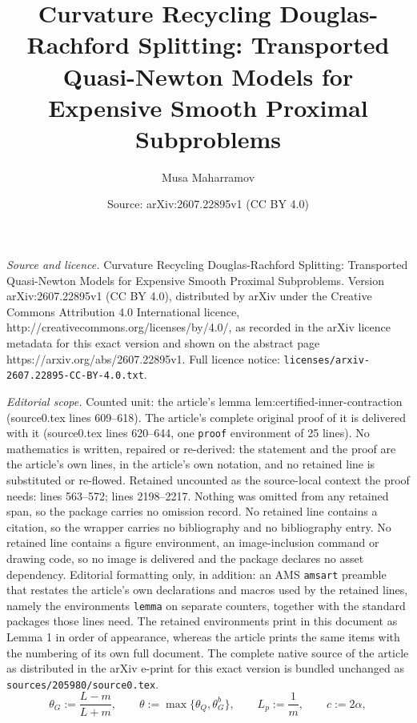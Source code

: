 \documentclass[10pt,a4paper]{amsart}
\title{Curvature Recycling Douglas-Rachford Splitting: Transported Quasi-Newton Models for Expensive Smooth Proximal Subproblems}
\author{Musa Maharramov}
\date{Source: arXiv:2607.22895v1 (CC BY 4.0)}
\begin{document}
\maketitle

\noindent\emph{Source and licence.} Curvature Recycling Douglas-Rachford Splitting: Transported Quasi-Newton Models for Expensive Smooth Proximal Subproblems. Version arXiv:2607.22895v1 (CC BY 4.0), distributed by arXiv under the Creative Commons Attribution 4.0 International licence, http://creativecommons.org/licenses/by/4.0/, as recorded in the arXiv licence metadata for this exact version and shown on the abstract page https://arxiv.org/abs/2607.22895v1. Full licence notice: \texttt{licenses/arxiv-2607.22895-CC-BY-4.0.txt}.\par\smallskip

\noindent\textit{Editorial scope.} Counted unit: the article's lemma lem:certified-inner-contraction (source0.tex lines 609--618). The article's complete original proof of it is delivered with it (source0.tex lines 620--644, one \texttt{proof} environment of 25 lines). No mathematics is written, repaired or re-derived: the statement and the proof are the article's own lines, in the article's own notation, and no retained line is substituted or re-flowed.  Retained uncounted as the source-local context the proof needs: lines 563--572; lines 2198--2217.  Nothing was omitted from any retained span, so the package carries no omission record.  No retained line contains a citation, so the wrapper carries no bibliography and no bibliography entry.  No retained line contains a figure environment, an image-inclusion command or drawing code, so no image is delivered and the package declares no asset dependency.  Editorial formatting only, in addition: an AMS \texttt{amsart} preamble that restates the article's own declarations and macros used by the retained lines, namely the environments \texttt{lemma} on separate counters, together with the standard packages those lines need.  The retained environments print in this document as Lemma 1 in order of appearance, whereas the article prints the same items with the numbering of its own full document.  The complete native source of the article as distributed in the arXiv e-print for this exact version is bundled unchanged as \texttt{sources/205980/source0.tex}.
\begin{equation}
\label{eq:inner-theta}
    \theta_G:=\frac{L-m}{L+m},
    \qquad
    \theta:=\max\{\theta_Q,\theta_G^b\},
    \qquad
    L_p:=\frac1m,
    \qquad
    c:=2\alpha,
\end{equation}
\end{document}
